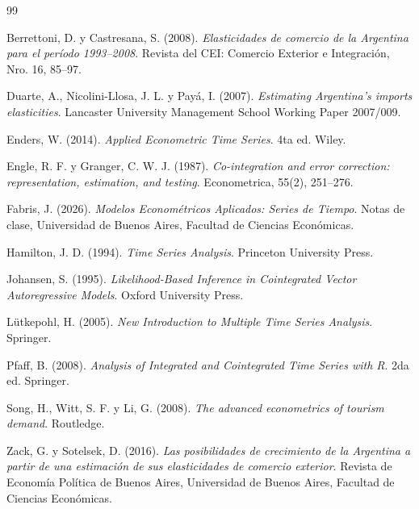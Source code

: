 \documentclass[11pt,a4paper]{article}
\begin{document}
	\begin{thebibliography}{99}

		Berrettoni, D. y Castresana, S. (2008).
		\textit{Elasticidades de comercio de la Argentina para el período 1993--2008}.
		Revista del CEI: Comercio Exterior e Integración, Nro. 16, 85--97.

		Duarte, A., Nicolini-Llosa, J. L. y Payá, I. (2007).
		\textit{Estimating Argentina's imports elasticities}.
		Lancaster University Management School Working Paper 2007/009.

		Enders, W. (2014).
		\textit{Applied Econometric Time Series}.
		4ta ed. Wiley.

		Engle, R. F. y Granger, C. W. J. (1987).
		\textit{Co-integration and error correction: representation, estimation, and
			testing}.
		Econometrica, 55(2), 251--276.

		Fabris, J. (2026).
		\textit{Modelos Econométricos Aplicados: Series de Tiempo}.
		Notas de clase, Universidad de Buenos Aires, Facultad de Ciencias Económicas.

		Hamilton, J. D. (1994).
		\textit{Time Series Analysis}.
		Princeton University Press.

		Johansen, S. (1995).
		\textit{Likelihood-Based Inference in Cointegrated Vector Autoregressive Models}.
		Oxford University Press.

		Lütkepohl, H. (2005).
		\textit{New Introduction to Multiple Time Series Analysis}.
		Springer.

		Pfaff, B. (2008).
		\textit{Analysis of Integrated and Cointegrated Time Series with R}.
		2da ed. Springer.

		Song, H., Witt, S. F. y Li, G. (2008).
		\textit{The advanced econometrics of tourism demand}.
		Routledge.

		Zack, G. y Sotelsek, D. (2016).
		\textit{Las posibilidades de crecimiento de la Argentina a partir de una
			estimación de sus elasticidades de comercio exterior}.
		Revista de Economía Política de Buenos Aires, Universidad de Buenos Aires,
		Facultad de Ciencias Económicas.

	\end{thebibliography}
	
	
\end{document}
